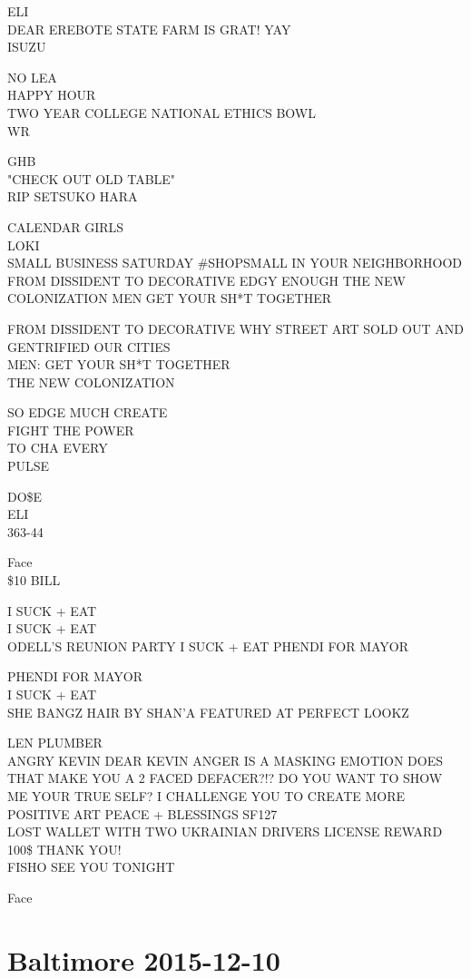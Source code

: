\documentclass[10pt,letterpaper]{article}
\begin{document}
ELI\\
DEAR EREBOTE STATE FARM IS GRAT!  YAY\\
ISUZU

NO LEA\\
HAPPY HOUR\\
TWO YEAR COLLEGE NATIONAL ETHICS BOWL\\
WR

GHB\\
"CHECK OUT OLD TABLE"\\
RIP SETSUKO HARA

CALENDAR GIRLS\\
LOKI\\
SMALL BUSINESS SATURDAY \#SHOPSMALL IN YOUR NEIGHBORHOOD\\
FROM DISSIDENT TO DECORATIVE EDGY ENOUGH THE NEW COLONIZATION MEN GET YOUR SH*T TOGETHER

FROM DISSIDENT TO DECORATIVE WHY STREET ART SOLD OUT AND GENTRIFIED OUR CITIES\\
MEN: GET YOUR SH*T TOGETHER\\
THE NEW COLONIZATION

SO EDGE MUCH CREATE\\
FIGHT THE POWER\\
TO CHA EVERY\\
PULSE

DO\$E\\
ELI\\
363{-}44

Face\\
\$10 BILL

I SUCK + EAT\\
I SUCK + EAT\\
ODELL'S REUNION PARTY I SUCK + EAT PHENDI FOR MAYOR

PHENDI FOR MAYOR\\
I SUCK + EAT\\
SHE BANGZ HAIR BY SHAN'A FEATURED AT PERFECT LOOKZ

LEN PLUMBER\\
ANGRY KEVIN DEAR KEVIN ANGER IS A MASKING EMOTION DOES THAT MAKE YOU A 2 FACED DEFACER?!?  DO YOU WANT TO SHOW ME YOUR TRUE SELF?  I CHALLENGE YOU TO CREATE MORE POSITIVE ART PEACE + BLESSINGS SF127\\
LOST WALLET WITH TWO UKRAINIAN DRIVERS LICENSE REWARD 100\$ THANK YOU!\\
FISHO SEE YOU TONIGHT

Face
\pagebreak

\section*{Baltimore 2015-12-10}
\end{document}
